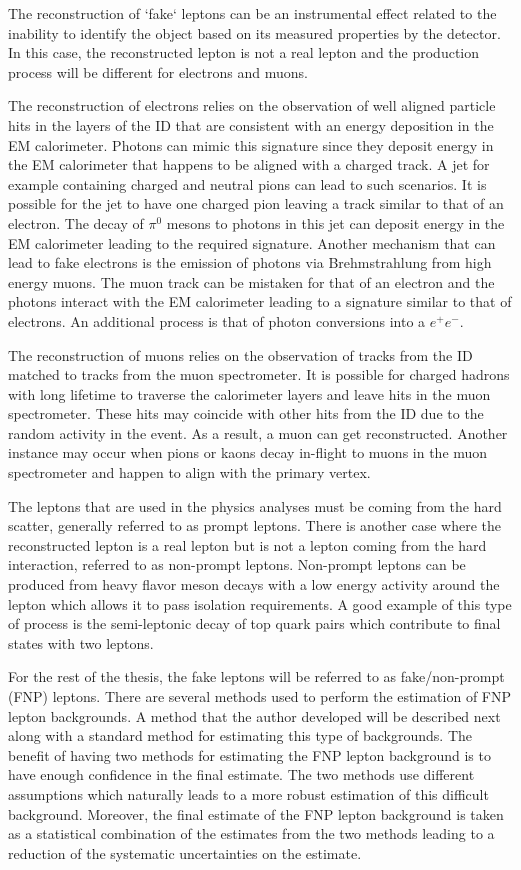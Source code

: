 The reconstruction of `fake` leptons can be an instrumental effect related to the inability to identify the object based on 
its measured properties by the detector. In this case, the reconstructed lepton is not a real lepton and the production process 
will be different for electrons and muons.

The reconstruction of electrons relies on the observation of well aligned particle hits in the layers of the ID that are consistent 
with an energy deposition in the EM calorimeter. Photons can mimic this signature since they deposit energy in the EM 
calorimeter that happens to be aligned with a charged track. A jet for example containing charged and neutral pions can 
lead to such scenarios. It is possible for the jet to have one charged pion leaving a track similar to that of an electron.
The decay of $\pi^0$ mesons to photons in this jet can deposit energy in the EM calorimeter leading to the required signature.
Another mechanism that can lead to fake electrons is the emission of photons via Brehmstrahlung from high energy muons. 
The muon track can be mistaken for that of an electron and the photons interact with the EM calorimeter leading to a
signature similar to that of electrons. An additional process is that of photon conversions into a $e^+e^-$.

The reconstruction of muons relies on the observation of tracks from the ID matched to tracks from the muon spectrometer.
It is possible for charged hadrons with long lifetime to traverse the calorimeter layers and leave hits in the muon spectrometer.
These hits may coincide with other hits from the ID due to the random activity in the event. As a result, a muon can get
reconstructed. Another instance may occur when pions or kaons decay in-flight to muons in the muon spectrometer
and happen to align with the primary vertex.

The leptons that are used in the physics analyses must be coming from the hard scatter, generally referred to as prompt leptons.
There is another case where the reconstructed lepton is a real lepton but is not a lepton coming from the hard interaction,
referred to as non-prompt leptons. Non-prompt leptons can be produced from heavy flavor meson decays with a low energy activity 
around the lepton which allows it to pass isolation requirements. A good example of this type of process is the 
semi-leptonic decay of top quark pairs which contribute to final states with two leptons. 

For the rest of the thesis, the fake leptons will be referred to as fake/non-prompt (FNP) leptons.
There are several methods used to perform the estimation of FNP lepton backgrounds. 
A method that the author developed will be described next along with a standard method for estimating this type of backgrounds.
The benefit of having two methods for estimating the FNP lepton background is to have enough confidence in the final estimate. 
The two methods use different assumptions which naturally leads to a more robust estimation of this difficult background.
Moreover, the final estimate of the FNP lepton background is taken as a statistical combination of the estimates from the 
two methods leading to a reduction of the systematic uncertainties on the estimate.
